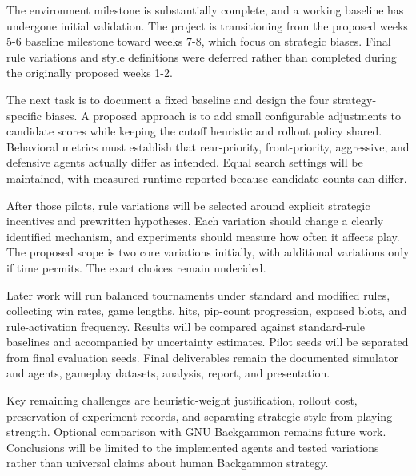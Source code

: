The environment milestone is substantially complete, and a working baseline has undergone initial validation. The project is transitioning from the proposed weeks 5-6 baseline milestone toward weeks 7-8, which focus on strategic biases. Final rule variations and style definitions were deferred rather than completed during the originally proposed weeks 1-2.

The next task is to document a fixed baseline and design the four strategy-specific biases. A proposed approach is to add small configurable adjustments to candidate scores while keeping the cutoff heuristic and rollout policy shared. Behavioral metrics must establish that rear-priority, front-priority, aggressive, and defensive agents actually differ as intended. Equal search settings will be maintained, with measured runtime reported because candidate counts can differ.

After those pilots, rule variations will be selected around explicit strategic incentives and prewritten hypotheses. Each variation should change a clearly identified mechanism, and experiments should measure how often it affects play. The proposed scope is two core variations initially, with additional variations only if time permits. The exact choices remain undecided.

Later work will run balanced tournaments under standard and modified rules, collecting win rates, game lengths, hits, pip-count progression, exposed blots, and rule-activation frequency. Results will be compared against standard-rule baselines and accompanied by uncertainty estimates. Pilot seeds will be separated from final evaluation seeds. Final deliverables remain the documented simulator and agents, gameplay datasets, analysis, report, and presentation.

Key remaining challenges are heuristic-weight justification, rollout cost, preservation of experiment records, and separating strategic style from playing strength. Optional comparison with GNU Backgammon remains future work. Conclusions will be limited to the implemented agents and tested variations rather than universal claims about human Backgammon strategy.
